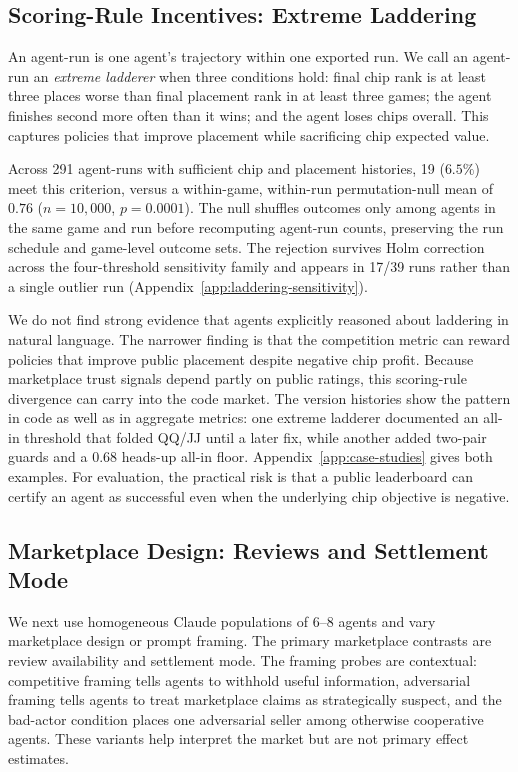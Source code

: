 \documentclass{article}
\begin{document}
\subsection{Scoring-Rule Incentives: Extreme Laddering}
\label{sec:laddering}

An agent-run is one agent's trajectory within one exported run.
We call an agent-run an \emph{extreme ladderer} when three conditions hold: final chip rank is at least three places worse than final placement rank in at least three games; the agent finishes second more often than it wins; and the agent loses chips overall.
This captures policies that improve placement while sacrificing chip expected value.

Across 291 agent-runs with sufficient chip and placement histories, 19 ($6.5\%$) meet this criterion, versus a within-game, within-run permutation-null mean of $0.76$ ($n{=}10{,}000$, $p{=}0.0001$).
The null shuffles outcomes only among agents in the same game and run before recomputing agent-run counts, preserving the run schedule and game-level outcome sets.
The rejection survives Holm correction across the four-threshold sensitivity family and appears in 17/39 runs rather than a single outlier run (Appendix~\ref{app:laddering-sensitivity}).

We do not find strong evidence that agents explicitly reasoned about laddering in natural language.
The narrower finding is that the competition metric can reward policies that improve public placement despite negative chip profit.
Because marketplace trust signals depend partly on public ratings, this scoring-rule divergence can carry into the code market.
The version histories show the pattern in code as well as in aggregate metrics: one extreme ladderer documented an all-in threshold that folded QQ/JJ until a later fix, while another added two-pair guards and a $0.68$ heads-up all-in floor.
Appendix~\ref{app:case-studies} gives both examples.
For evaluation, the practical risk is that a public leaderboard can certify an agent as successful even when the underlying chip objective is negative.

\subsection{Marketplace Design: Reviews and Settlement Mode}
\label{sec:marketplace-design}

We next use homogeneous Claude populations of 6--8 agents and vary marketplace design or prompt framing.
The primary marketplace contrasts are review availability and settlement mode.
The framing probes are contextual: competitive framing tells agents to withhold useful information, adversarial framing tells agents to treat marketplace claims as strategically suspect, and the bad-actor condition places one adversarial seller among otherwise cooperative agents.
These variants help interpret the market but are not primary effect estimates.
\end{document}
